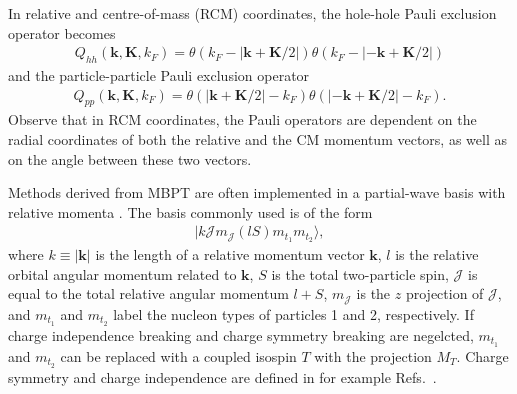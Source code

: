 \documentclass[a4paper,12pt]{report}
\begin{document}

In relative and centre-of-mass (RCM) coordinates, 
the hole-hole Pauli exclusion operator becomes
\begin{align}
  Q_{hh}(\mathbf{k}, \mathbf{K}, k_{F})=\theta(k_{F}-|\mathbf{k}+\mathbf{K}/2|)
  \theta(k_{F}-|-\mathbf{k}+\mathbf{K}/2|)
  \label{eq:paulihh_rcm}
\end{align} 
and the particle-particle Pauli exclusion operator
\begin{align}
  Q_{pp}(\mathbf{k}, \mathbf{K}, k_{F})=\theta(|\mathbf{k}+\mathbf{K}/2|-k_{F})
  \theta(|-\mathbf{k}+\mathbf{K}/2|-k_{F}).
  \label{eq:paulipp_rcm}
\end{align}
Observe that in RCM coordinates, the Pauli operators are dependent on
the radial coordinates of both the relative and the CM momentum vectors,
as well as on the angle between these two vectors.

Methods derived from MBPT are often implemented in a partial-wave basis with relative momenta \cite{mackenzie, haftel_tabakin}. The basis commonly used is of the form
\begin{align}
  |k\mathcal{J}m_{\mathcal{J}}(lS)m_{t_{1}}m_{t_{2}}\rangle,
  \label{eq:coupled_basis1}
\end{align}
where $k \equiv |\mathbf{k}|$ is the length of a relative momentum vector $\mathbf{k}$, $l$ is the relative orbital angular momentum related to $\mathbf{k}$, $S$ is the total two-particle spin, $\mathcal{J}$ is equal to the total relative angular momentum $l+S$, $m_{\mathcal{J}}$ is the $z$ projection of $\mathcal{J}$, and $m_{t_{1}}$ and $m_{t_{2}}$ label the nucleon types of particles 1 and 2, respectively. If charge independence breaking and charge symmetry breaking are negelcted, $m_{t_{1}}$ and $m_{t_{2}}$ can be replaced with a coupled isospin $T$ with the projection $M_{T}$. Charge symmetry and charge independence are defined in for example Refs.~\cite{heyde, machleidt2011}.

\end{document}
